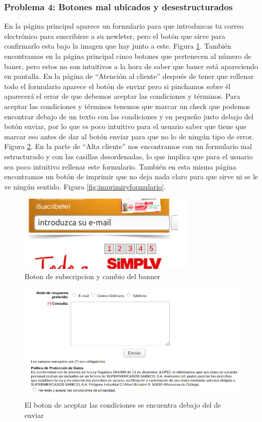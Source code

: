 \documentclass[a4paper,11pt]{article}
\begin{document}
\subsubsection{Problema 4: Botones mal ubicados y desestructurados}
En la página principal aparece un formulario para que introduzcas tu correo electrónico para suscribirse a su newleter, pero el botón que sirve para confirmarlo esta bajo la imagen que hay junto a este. Figura \ref{fig:bannerysubs}.
También encontramos en la página principal cinco botones que pertenecen al número de baner, pero estos no son intuitivos a la hora de saber que baner está apareciendo en pantalla. En la página de “Atención al cliente” después de tener que rellenar todo el formulario aparece el botón de enviar pero si pinchamos sobre él aparecerá el error de que debemos aceptar las condiciones y términos. Para aceptar las condiciones y términos tenemos que marcar un check que podemos encontrar debajo de un texto con las condiciones y en pequeño justo debajo del botón enviar, por lo que es poco intuitivo para el usuario saber que tiene que marcar eso antes de dar al botón enviar para que no lo de ningún tipo de error. Figura \ref{fig:formulariocondiciones}.
En la parte de “Alta cliente” nos encontramos con un formulario mal estructurado y con las casillas desordenadas, lo que implica que para el usuario sea poco intuitivo rellenar este formulario. También en esta misma página encontramos un botón de imprimir que no deja nada claro para que sirve ni se le ve ningún sentido. Figura \ref{fig:imprimiryformulario}.


\begin{figure}
 \centering
 \includegraphics[scale=0.5]{bannerysubs.png}
 \caption{Boton de subscripcion y cambio del banner}
 \label{fig:bannerysubs}
\end{figure}

\begin{figure}
 \centering
 \includegraphics[scale=0.5]{formulariocondiciones.png}
 \caption{El boton de aceptar las condiciones se encuentra debajo del de enviar}
 \label{fig:formulariocondiciones}
\end{figure}
\end{document}
